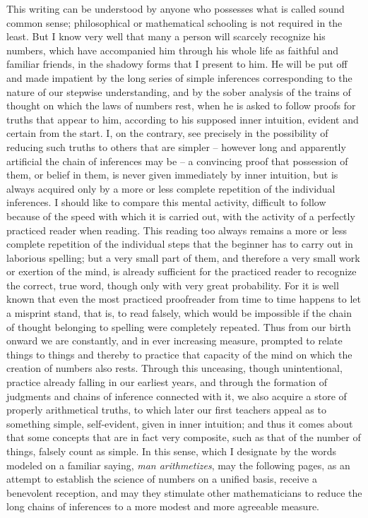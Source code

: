 \documentclass[11pt]{article}
\begin{document}
This writing can be understood by anyone who possesses what is called sound common sense; philosophical or mathematical schooling is not required in the least. But I know very well that many a person will scarcely recognize his numbers, which have accompanied him through his whole life as faithful and familiar friends, in the shadowy forms that I present to him. He will be put off and made impatient by the long series of simple inferences corresponding to the nature of our stepwise understanding, and by the sober analysis of the trains of thought on which the laws of numbers rest, when he is asked to follow proofs for truths that appear to him, according to his supposed inner intuition, evident and certain from the start. I, on the contrary, see precisely in the possibility of reducing such truths to others that are simpler -- however long and apparently artificial the chain of inferences may be -- a convincing proof that possession of them, or belief in them, is never given immediately by inner intuition, but is always acquired only by a more or less complete repetition of the individual inferences. I should like to compare this mental activity, difficult to follow because of the speed with which it is carried out, with the activity of a perfectly practiced reader when reading. This reading too always remains a more or less complete repetition of the individual steps that the beginner has to carry out in laborious spelling; but a very small part of them, and therefore a very small work or exertion of the mind, is already sufficient for the practiced reader to recognize the correct, true word, though only with very great probability. For it is well known that even the most practiced proofreader from time to time happens to let a misprint stand, that is, to read falsely, which would be impossible if the chain of thought belonging to spelling were completely repeated. Thus from our birth onward we are constantly, and in ever increasing measure, prompted to relate things to things and thereby to practice that capacity of the mind on which the creation of numbers also rests. Through this unceasing, though unintentional, practice already falling in our earliest years, and through the formation of judgments and chains of inference connected with it, we also acquire a store of properly arithmetical truths, to which later our first teachers appeal as to something simple, self-evident, given in inner intuition; and thus it comes about that some concepts that are in fact very composite, such as that of the number of things, falsely count as simple. In this sense, which I designate by the words modeled on a familiar saying, \emph{man arithmetizes}, may the following pages, as an attempt to establish the science of numbers on a unified basis, receive a benevolent reception, and may they stimulate other mathematicians to reduce the long chains of inferences to a more modest and more agreeable measure.
\end{document}
